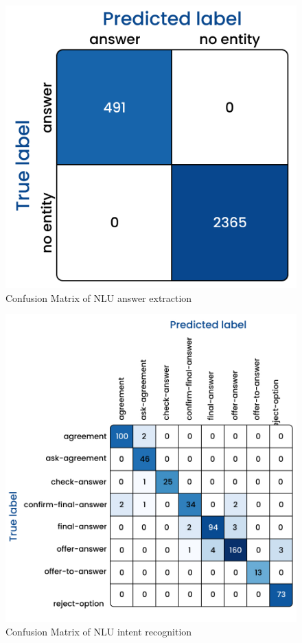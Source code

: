 \documentclass[hidelinks, 11pt]{article}
\begin{document}
\begin{figure}[h!]
  \includegraphics[width=\columnwidth]{images/answer_confusion_matrix.jpg}
  \caption{Confusion Matrix of NLU answer extraction}
  \label{fig:cm_answer_extraction}
\end{figure}

\begin{figure}[h!]
  \includegraphics[width=\columnwidth]{images/intent_confusion_matrix.jpg}
  \caption{Confusion Matrix of NLU intent recognition}
  \label{fig:cm_intent_recognition}
\end{figure}
\end{document}
